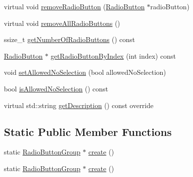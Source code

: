 \begin{DoxyCompactItemize}
virtual void \hyperlink{classui_1_1RadioButtonGroup_a9e25da5a8c992588766bf4d2cca28d9e}{remove\+Radio\+Button} (\hyperlink{classui_1_1RadioButton}{Radio\+Button} $\ast$radio\+Button)
\item 
virtual void \hyperlink{classui_1_1RadioButtonGroup_a2916491f3e7a42e4fb2bc4a31a8ea240}{remove\+All\+Radio\+Buttons} ()
\item 
ssize\+\_\+t \hyperlink{classui_1_1RadioButtonGroup_a673d0fac47fbe688d10ffa361d8ae980}{get\+Number\+Of\+Radio\+Buttons} () const
\item 
\hyperlink{classui_1_1RadioButton}{Radio\+Button} $\ast$ \hyperlink{classui_1_1RadioButtonGroup_af82618a1cef27bf24b3d0721d4cfaf14}{get\+Radio\+Button\+By\+Index} (int index) const
\item 
void \hyperlink{classui_1_1RadioButtonGroup_ac59b251d0cb6b439412172dd98cd9491}{set\+Allowed\+No\+Selection} (bool allowed\+No\+Selection)
\item 
bool \hyperlink{classui_1_1RadioButtonGroup_a9eafb80fea9559a6838d46321063d79a}{is\+Allowed\+No\+Selection} () const
\item 
virtual std\+::string \hyperlink{classui_1_1RadioButtonGroup_aed6a80ca4ca4cb6a91efa19de06829ae}{get\+Description} () const override
\end{DoxyCompactItemize}
\subsection*{Static Public Member Functions}
\begin{DoxyCompactItemize}
\item 
static \hyperlink{classui_1_1RadioButtonGroup}{Radio\+Button\+Group} $\ast$ \hyperlink{classui_1_1RadioButtonGroup_a9832b6d251d9d50ac3cdcb73b31cf5ec}{create} ()
\item 
static \hyperlink{classui_1_1RadioButtonGroup}{Radio\+Button\+Group} $\ast$ \hyperlink{classui_1_1RadioButtonGroup_a2ee178b9fba030c5f02aa5110dfb71b2}{create} ()
\end{DoxyCompactItemize}
